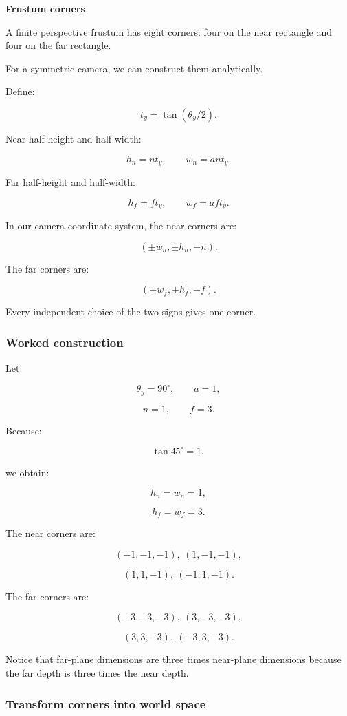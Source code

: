 \textbf{Frustum corners}

A finite perspective frustum has eight corners: four on the near rectangle and four on the far rectangle.

For a symmetric camera, we can construct them analytically.

Define:

\[
 t_y=\tan(\theta_y/2).
\]

Near half-height and half-width:

\[
 \boxed{ h_n=nt_y,\qquad w_n=ant_y }.
\]

Far half-height and half-width:

\[
 \boxed{ h_f=ft_y,\qquad w_f=aft_y }.
\]

In our camera coordinate system, the near corners are:

\[
 \boxed{ (\pm w_n,\pm h_n,-n) }.
\]

The far corners are:

\[
 \boxed{ (\pm w_f,\pm h_f,-f) }.
\]

Every independent choice of the two signs gives one corner.

\subsubsection{Worked construction}\label{worked-construction}

Let:

\[
 \theta_y=90^\circ,\qquad a=1,
\]

\[
 n=1,\qquad f=3.
\]

Because:

\[
 \tan45^\circ=1,
\]

we obtain:

\[
 h_n=w_n=1,
\]

\[
 h_f=w_f=3.
\]

The near corners are:

\[
 (-1,-1,-1),\ (1,-1,-1),
\]

\[
 (1,1,-1),\ (-1,1,-1).
\]

The far corners are:

\[
 (-3,-3,-3),\ (3,-3,-3),
\]

\[
 (3,3,-3),\ (-3,3,-3).
\]

Notice that far-plane dimensions are three times near-plane dimensions because the far depth is three times the near depth.

\subsubsection{Transform corners into world space}\label{transform-corners-into-world-space}

